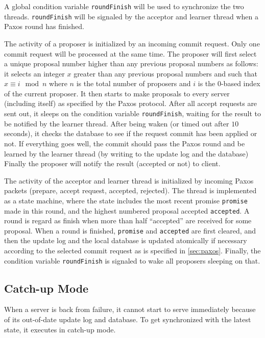 \documentclass[11pt]{article}
\begin{document}
A global condition variable \texttt{roundFinish} will be used to synchronize the two threads.
\texttt{roundFinish} will be signaled by the acceptor and learner thread when a Paxos round has finished.

The activity of a proposer is initialized by an incoming commit request.
Only one commit request will be processed at the same time.
The proposer will first select a unique proposal number higher than any previous proposal numbers as follows:
it selects an integer $x$ greater than any previous proposal numbers and such that $x \equiv i \mod n$ where $n$ is the total number of proposers and $i$ is the $0$-based index of the current proposer.
It then starts to make proposals to every server (including itself) as specified by the Paxos protocol.
After all accept requests are sent out, it sleeps on the condition variable \texttt{roundFinish}, waiting for the result to be notified by the learner thread.
After being waken (or timed out after $10$ seconds), it checks the database to see if the request commit has been applied or not.
If everything goes well, the commit should pass the Paxos round and be learned by the learner thread (by writing to the update log and the database)
Finally the proposer will notify the result (accepted or not) to client.

The activity of the acceptor and learner thread is initialized by incoming Paxos packets (prepare, accept request, accepted, rejected).
The thread is implemented as a state machine, where the state includes the most recent promise \texttt{promise} made in this round, and the highest numbered proposal accepted \texttt{accepted}.
A round is regard as finish when more than half ``accepted'' are received for some proposal.
When a round is finished, \texttt{promise} and \texttt{accepted} are first cleared, and then the update log and the local database is updated atomically if necessary according to the selected commit request as is specified in \ref{sec:paxos}.
Finally, the condition variable \texttt{roundFinish} is signaled to wake all proposers sleeping on that.

\subsection{Catch-up Mode}
When a server is back from failure, it cannot start to serve immediately because of its out-of-date update log and database.
To get synchronized with the latest state, it executes in catch-up mode.
\end{document}
